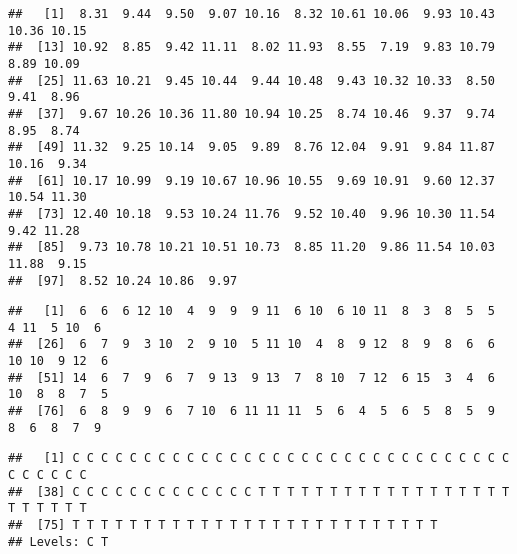 \documentclass[
]{article}
\newenvironment{Shaded}{\begin{snugshade}}{\end{snugshade}}
\newcommand{\CommentTok}[1]{\textcolor[rgb]{0.56,0.35,0.01}{\textit{#1}}}
\newcommand{\NormalTok}[1]{#1}
\newcommand{\SpecialCharTok}[1]{\textcolor[rgb]{0.00,0.00,0.00}{#1}}
\begin{document}
\begin{Shaded}
\end{Shaded}

\begin{verbatim}
##   [1]  8.31  9.44  9.50  9.07 10.16  8.32 10.61 10.06  9.93 10.43 10.36 10.15
##  [13] 10.92  8.85  9.42 11.11  8.02 11.93  8.55  7.19  9.83 10.79  8.89 10.09
##  [25] 11.63 10.21  9.45 10.44  9.44 10.48  9.43 10.32 10.33  8.50  9.41  8.96
##  [37]  9.67 10.26 10.36 11.80 10.94 10.25  8.74 10.46  9.37  9.74  8.95  8.74
##  [49] 11.32  9.25 10.14  9.05  9.89  8.76 12.04  9.91  9.84 11.87 10.16  9.34
##  [61] 10.17 10.99  9.19 10.67 10.96 10.55  9.69 10.91  9.60 12.37 10.54 11.30
##  [73] 12.40 10.18  9.53 10.24 11.76  9.52 10.40  9.96 10.30 11.54  9.42 11.28
##  [85]  9.73 10.78 10.21 10.51 10.73  8.85 11.20  9.86 11.54 10.03 11.88  9.15
##  [97]  8.52 10.24 10.86  9.97
\end{verbatim}

\begin{Shaded}
\end{Shaded}

\begin{verbatim}
##   [1]  6  6  6 12 10  4  9  9  9 11  6 10  6 10 11  8  3  8  5  5  4 11  5 10  6
##  [26]  6  7  9  3 10  2  9 10  5 11 10  4  8  9 12  8  9  8  6  6 10 10  9 12  6
##  [51] 14  6  7  9  6  7  9 13  9 13  7  8 10  7 12  6 15  3  4  6 10  8  8  7  5
##  [76]  6  8  9  9  6  7 10  6 11 11 11  5  6  4  5  6  5  8  5  9  8  6  8  7  9
\end{verbatim}

\begin{Shaded}
\end{Shaded}

\begin{verbatim}
##   [1] C C C C C C C C C C C C C C C C C C C C C C C C C C C C C C C C C C C C C
##  [38] C C C C C C C C C C C C C T T T T T T T T T T T T T T T T T T T T T T T T
##  [75] T T T T T T T T T T T T T T T T T T T T T T T T T T
## Levels: C T
\end{verbatim}
\end{document}
